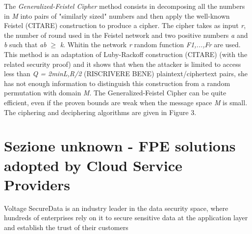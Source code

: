 The \textit{Generalized-Feistel Cipher} method consists in decomposing all the numbers in \textit{M} into pairs of "similarly sized" numbers and then apply the well-known Feistel (CITARE) construction to produce a cipher.
The cipher takes as input \textit{r}, the number of round used in the Feistel network and two positive numbers \textit{a} and \textit{b} such that \textit{a}\textit{b} $\geq$ \textit{k}. Whitin the network \textit{r} random function \textit{F1,...,Fr} are used.
This method is an adaptation of Luby-Rackoff construction (CITARE) (with the related security proof) and it shows that when the attacker is limited to access less than \textit{Q = 2min{L,R}/2} (RISCRIVERE BENE) plaintext/ciphertext pairs, she has not enough information to distinguish this construction from a random permutation with domain \textit{M}.
The Generalized-Feistel Cipher can be quite efficient, even if the proven bounds are weak when the message space \textit{M} is small.
The ciphering and deciphering algorithms are given in Figure 3.

\section{Sezione unknown - FPE solutions adopted by Cloud Service Providers}
Voltage SecureData is an industry leader in the data security space, where hundreds of enterprises rely on it to secure sensitive data at the application layer and establish the trust of their customers
